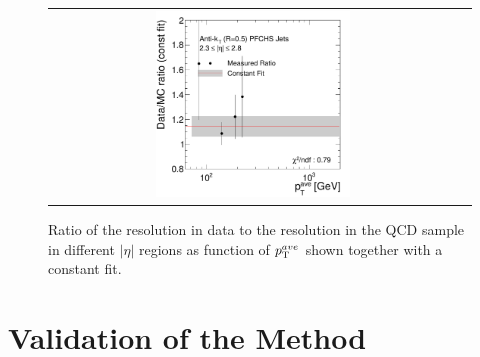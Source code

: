 \begin{figure}[!htp]
\begin{tabular}{cc}
                \includegraphics[width=0.49\textwidth]{figures/ExtrapolRatio_Eta4_with_pli_final_nominal_v4.pdf}
  \end{tabular}
  \caption{Ratio of the resolution in data to the resolution in the QCD sample in different $|\eta|$ regions as function of $p_{\text{T}}^{ave}$ shown together with a constant fit.}
  \label{fig:ratio}
\end{figure}

\section{Validation of the Method}
\label{sec:jer_validation}

